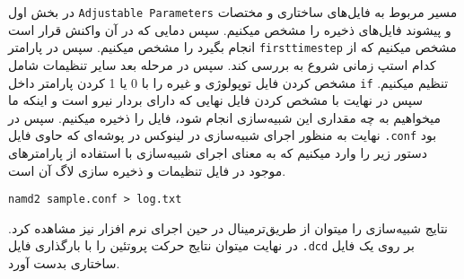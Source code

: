 در بخش اول \verb|Adjustable Parameters| مسیر مربوط به فایل‌‌های ساختاری و مختصات و پیشوند فایل‌‌های ذخیره را مشخص میکنیم. سپس دمایی که در آن واکنش قرار است انجام بگیرد را مشخص میکنیم. سپس در پارامتر \verb|firsttimestep| مشخص میکنیم که از کدام استپ زمانی شروع به بررسی کند.
سپس در مرحله بعد سایر تنظیمات شامل مشخص کردن فایل توپولوژی و غیره را با 0 یا 1 کردن پارامتر داخل \verb*|if| تنظیم میکنیم.
سپس در نهایت با مشخص کردن فایل نهایی که دارای بردار نیرو است و اینکه ما میخواهیم به چه مقداری این شبیه‌سازی‌ انجام شود، فایل را ذخیره میکنیم.
سپس در نهایت به منظور اجرای شبیه‌سازی‌ در لینوکس در پوشه‌ای که حاوی فایل \verb*|.conf| بود دستور زیر را وارد میکنیم که به معنای اجرای شبیه‌سازی‌ با استفاده از پارامتر‌‌های موجود در فایل تنظیمات و ذخیره سازی لاگ آن است.
\begin{latin}
	\verb|namd2 sample.conf > log.txt|
\end{latin}
نتایج شبیه‌سازی‌ را میتوان از طریق‌ترمینال در حین اجرای نرم افزار نیز مشاهده کرد.
در نهایت میتوان نتایج حرکت پروتئین را با بارگذاری فایل \verb*|.dcd| بر روی یک فایل ساختاری بدست آورد.
